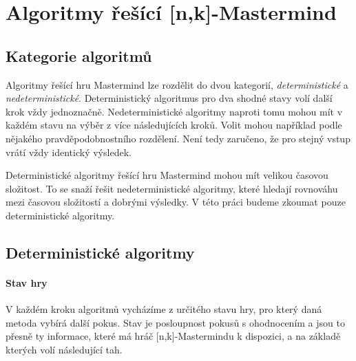 \chapter{Algoritmy řešící [n,k]-Mastermind}

\section{Kategorie algoritmů}
Algoritmy řešící hru Mastermind lze rozdělit do dvou kategorií, \emph{deterministické} a \emph{nedeterministické}. Deterministický algoritmus pro dva shodné stavy volí další krok vždy jednoznačně. 
Nedeterministické algoritmy naproti tomu mohou mít v každém stavu na výběr z více následujících kroků. Volit mohou například podle nějakého pravděpodobnostního rozdělení. Není tedy zaručeno, že pro stejný vstup vrátí vždy identický výsledek.

Deterministické algoritmy řešící hru Mastermind mohou mít velikou časovou složitost. To se snaží řešit nedeterministické algoritmy, které hledají rovnováhu mezi časovou složitostí a dobrými výsledky. 
V této práci budeme zkoumat pouze deterministické algoritmy. 



\section{Deterministické algoritmy}

\subsubsection{Stav hry}
V každém kroku algoritmů vycházíme z určitého stavu hry, pro který daná metoda vybírá další pokus. Stav je posloupnost pokusů s ohodnocením a jsou to přesně ty informace, které má hráč [n,k]-Mastermindu k dispozici, a na základě kterých volí následující tah.


